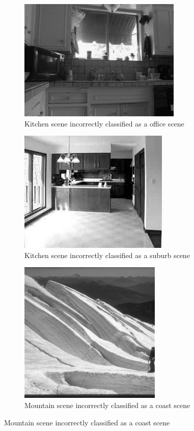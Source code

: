 \begin{homeworkProblem}
\begin{figure}[H]\ContinuedFloat
  \begin{subfigure}{0.5\textwidth}
    \centering
    \includegraphics[width=.5\linewidth]{./images/3_offi.jpg}
    \caption{Kitchen scene incorrectly classified as a office scene}
  \end{subfigure}%
  \begin{subfigure}{0.5\textwidth}
    \centering
    \includegraphics[width=.5\linewidth]{./images/3_surb.jpg}
    \caption{Kitchen scene incorrectly classified as a suburb scene}
  \end{subfigure}
  \begin{subfigure}{0.5\textwidth}
    \centering
    \includegraphics[width=.5\linewidth]{./images/4_coas.jpg}
    \caption{Mountain scene incorrectly classified as a coast scene}
  \end{subfigure}%

\end{figure}
\end{homeworkProblem}
